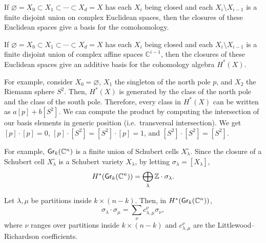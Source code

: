 If \(\varnothing = X_0 \subset X_1 \subset \cdots \subset X_d = X\) has each \(X_i\) being closed and each \(X_i \setminus X_{i-1}\) is a finite disjoint union on complex Euclidean spaces,
then the closures of these Euclidean spaces give a basis for the comohomology.

\begin{proposition}
    If \(\varnothing = X_0 \subset X_1 \subset \cdots \subset X_d = X\)
    has each \(X_i\) being closed and each \(X_i \setminus X_{i-1}\) is a finite disjoint union of complex affine spaces \(\mathbb{C}^{i-1}\),
    then the closures of these Euclidean spaces give an additive basis for the cohomology algebra \(H^*(X)\).
\end{proposition}

For example, consider \(X_0 = \varnothing\), \(X_1\) the singleton of the north pole \(p\), and \(X_2\) the Riemann sphere \(S^2\).
Then, \(H^*(X)\) is generated by the class of the north pole and the class of the south pole.
Therefore, every class in \(H^*(X)\) can be written as \(a [p] + b [S^2]\).
We can compute the product by computing the intersection of our basis elements in generic position (i.e.\ transversal intersection).
We get \([p] \cdot [p] = 0\), \([p] \cdot [S^2] = [S^2] \cdot [p] = 1\), and \([S^2] \cdot [S^2] = [S^2]\).

For example, \(\operatorname{\mathsf{Gr}}_k(\mathbb{C}^n)\) is a finite union of Schubert cells \(X^{\circ}_{\lambda}\).
Since the closure of a Schubert cell \(X^{\circ}_{\lambda}\) is a Schubert variety \(X_{\lambda}\), by letting \(\sigma_{\lambda} = [X_{\lambda}]\),
\begin{equation}
    H^*(\operatorname{\mathsf{Gr}}_k(\mathbb{C}^n)) = \bigoplus_{\lambda} \mathbb{Z} \cdot \sigma_{\lambda}.
\end{equation}

\begin{theorem}
    Let \(\lambda, \mu\) be partitions inside \(k \times (n-k)\).
    Then, in \(H^*(\operatorname{\mathsf{Gr}}_k(\mathbb{C}^n))\),
    \begin{equation}
        \sigma_{\lambda} \cdot \sigma_{\mu} = \sum_{\nu} c_{\lambda, \mu}^{\nu} \sigma_{\nu},
    \end{equation}
    where \(\nu\) ranges over partitions inside \(k \times (n-k)\) and \(c_{\lambda, \mu}^{\nu}\) are the Littlewood--Richardson coefficients.
\end{theorem}

